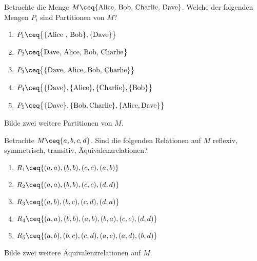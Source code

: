 \begin{aufg}

  Betrachte die Menge $M \ceq \{ \text{Alice, Bob, Charlie, Dave} \}$. Welche der
  folgenden Mengen $P_{i}$ sind Partitionen von $M$?
  \begin{enumerate}
    \item $P_{1}\ceq\big\{  \{ \text{Alice , Bob}  \} , \{ \text{Dave} \} \big\}$
    \item $P_{2}\ceq\big\{ \text{Dave, Alice, Bob, Charlie} \big\}$
    \item $P_{3}\ceq\big\{  \{ \text{Dave, Alice, Bob, Charlie} \} \big\}$
    \item $P_{4}\ceq\big\{  \{ \text{Dave} \} , \{ \text{Alice} \} , \{ \text{Charlie} \} , \{ \text{Bob} \} \big\}$
    \item $P_{5}\ceq\big\{  \{ \text{Dave} \} , \{ \text{Bob}, \text{Charlie} \} , \{ \text{Alice}, \text{Dave} \}  \big\}$
  \end{enumerate}
  Bilde zwei weitere Partitionen von $M$.
  
\end{aufg}


\begin{aufg}

  Betrachte $M \ceq \{ a, b, c, d\}$. Sind die folgenden Relationen auf $M$
  reflexiv, symmetrisch, transitiv, Äquivalenzrelationen?
  \begin{enumerate}
    \item $R_{1} \ceq \{ (a,a) , (b,b) , (c,c) , (a,b) \}$
    \item $R_{2} \ceq \{ (a,a) , (b,b) , (c,c) , (d,d) \}$
    \item $R_{3} \ceq \{ (a,b) , (b,c) , (c,d) , (d,a) \}$
    \item $R_{4} \ceq \{ (a,a) , (b,b) , (a,b) , (b,a) , (c,c) , (d,d)\}$
    \item $R_{5} \ceq \{ (a,b) , (b,c) , (c,d) , (a,c) , (a,d) , (b,d)\}$
  \end{enumerate}
  Bilde zwei weitere Äquivalenzrelationen auf $M$.
  
\end{aufg}


